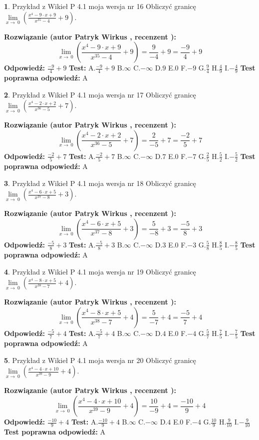 \documentclass[12pt, a4paper]{article}
\theoremstyle{definition} %
\newtheorem{zad}{}
\newcommand{\zadStart}[1]{\begin{zad}#1\newline}
\newcommand{\zadStop}{\end{zad}}
\newcommand{\rozwStart}[2]{\noindent \textbf{Rozwiązanie (autor #1 , recenzent #2): }\newline}
\newcommand{\rozwStop}{\newline}
\newcommand{\odpStart}{\noindent \textbf{Odpowiedź:}\newline}
\newcommand{\odpStop}{\newline}
\newcommand{\testStart}{\noindent \textbf{Test:}\newline}
\newcommand{\testStop}{\newline}
\newcommand{\kluczStart}{\noindent \textbf{Test poprawna odpowiedź:}\newline}
\newcommand{\kluczStop}{\newline}
\begin{document}
\zadStart{Przykład z Wikieł P 4.1 moja wersja nr 16}
Obliczyć granicę $\lim\limits_{x\to\ 0}(\frac{x^{4}-9 \cdot x +9}{x^{35}-4}+9)$.
\zadStop
\rozwStart{Patryk Wirkus}{}
$$\lim\limits_{x\to\ 0}(\frac{x^{4}-9 \cdot x +9}{x^{35}-4}+9)=\frac{9}{-4}+9=\frac{-9}{4}+9$$
\rozwStop
\odpStart
$\frac{-9}{4}+9$
\odpStop
\testStart
A.$\frac{-9}{4}+9$
B.$\infty$
C.$-\infty$
D.$9$
E.$0$
F.$-9$
G.$\frac{9}{4}$
H.$\frac{4}{9}$
I.$-\frac{4}{9}$
\testStop
\kluczStart
A
\kluczStop



\zadStart{Przykład z Wikieł P 4.1 moja wersja nr 17}
Obliczyć granicę $\lim\limits_{x\to\ 0}(\frac{x^{4}-2 \cdot x +2}{x^{36}-5}+7)$.
\zadStop
\rozwStart{Patryk Wirkus}{}
$$\lim\limits_{x\to\ 0}(\frac{x^{4}-2 \cdot x +2}{x^{36}-5}+7)=\frac{2}{-5}+7=\frac{-2}{5}+7$$
\rozwStop
\odpStart
$\frac{-2}{5}+7$
\odpStop
\testStart
A.$\frac{-2}{5}+7$
B.$\infty$
C.$-\infty$
D.$7$
E.$0$
F.$-7$
G.$\frac{2}{5}$
H.$\frac{5}{2}$
I.$-\frac{5}{2}$
\testStop
\kluczStart
A
\kluczStop



\zadStart{Przykład z Wikieł P 4.1 moja wersja nr 18}
Obliczyć granicę $\lim\limits_{x\to\ 0}(\frac{x^{4}-6 \cdot x +5}{x^{37}-8}+3)$.
\zadStop
\rozwStart{Patryk Wirkus}{}
$$\lim\limits_{x\to\ 0}(\frac{x^{4}-6 \cdot x +5}{x^{37}-8}+3)=\frac{5}{-8}+3=\frac{-5}{8}+3$$
\rozwStop
\odpStart
$\frac{-5}{8}+3$
\odpStop
\testStart
A.$\frac{-5}{8}+3$
B.$\infty$
C.$-\infty$
D.$3$
E.$0$
F.$-3$
G.$\frac{5}{8}$
H.$\frac{8}{5}$
I.$-\frac{8}{5}$
\testStop
\kluczStart
A
\kluczStop



\zadStart{Przykład z Wikieł P 4.1 moja wersja nr 19}
Obliczyć granicę $\lim\limits_{x\to\ 0}(\frac{x^{4}-8 \cdot x +5}{x^{38}-7}+4)$.
\zadStop
\rozwStart{Patryk Wirkus}{}
$$\lim\limits_{x\to\ 0}(\frac{x^{4}-8 \cdot x +5}{x^{38}-7}+4)=\frac{5}{-7}+4=\frac{-5}{7}+4$$
\rozwStop
\odpStart
$\frac{-5}{7}+4$
\odpStop
\testStart
A.$\frac{-5}{7}+4$
B.$\infty$
C.$-\infty$
D.$4$
E.$0$
F.$-4$
G.$\frac{5}{7}$
H.$\frac{7}{5}$
I.$-\frac{7}{5}$
\testStop
\kluczStart
A
\kluczStop



\zadStart{Przykład z Wikieł P 4.1 moja wersja nr 20}
Obliczyć granicę $\lim\limits_{x\to\ 0}(\frac{x^{4}-4 \cdot x +10}{x^{39}-9}+4)$.
\zadStop
\rozwStart{Patryk Wirkus}{}
$$\lim\limits_{x\to\ 0}(\frac{x^{4}-4 \cdot x +10}{x^{39}-9}+4)=\frac{10}{-9}+4=\frac{-10}{9}+4$$
\rozwStop
\odpStart
$\frac{-10}{9}+4$
\odpStop
\testStart
A.$\frac{-10}{9}+4$
B.$\infty$
C.$-\infty$
D.$4$
E.$0$
F.$-4$
G.$\frac{10}{9}$
H.$\frac{9}{10}$
I.$-\frac{9}{10}$
\testStop
\kluczStart
A
\kluczStop
\end{document}
